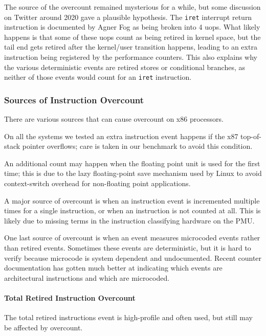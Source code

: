 The source of the overcount remained mysterious for a while, but some
discussion on Twitter around 2020 gave a plausible hypothesis.
The {\tt iret} interrupt return instruction is documented by
Agner Fog as being broken into 4 uops.
What likely happens is that some of these uops count as being retired
in kernel space, but the tail end gets retired after the kernel/user
transition happens, leading to an extra instruction being registered
by the performance counters.
This also explains why the various deterministic events are
retired stores or conditional branches, as neither of those events
would count for an {\tt iret} instruction.

\subsubsection{Sources of Instruction Overcount}

There are various sources that can cause overcount on x86 processors.

On all the systems we tested an extra instruction event happens if the 
x87 top-of-stack pointer overflows; care is taken in our benchmark to 
avoid this condition.  

An additional count may happen when the floating point unit is 
used for the first time; this is due to
the lazy floating-point save mechanism used by Linux to avoid context-switch 
overhead for non-floating point applications.  

A major source of overcount is when an instruction event is incremented
multiple times for a single instruction, or when an instruction
is not counted at all.  This is likely due to missing terms in the
instruction classifying hardware on the PMU.

One last source of overcount is when an event measures microcoded events
rather than retired events.  Sometimes these events are deterministic,
but it is hard to verify because microcode is system dependent and
undocumented.  Recent counter documentation has gotten much better
at indicating which events are architectural instructions and which 
are microcoded.

\paragraph {Total Retired Instruction Overcount}

The total retired instructions event is high-profile and often used,
but still may be affected by overcount.

